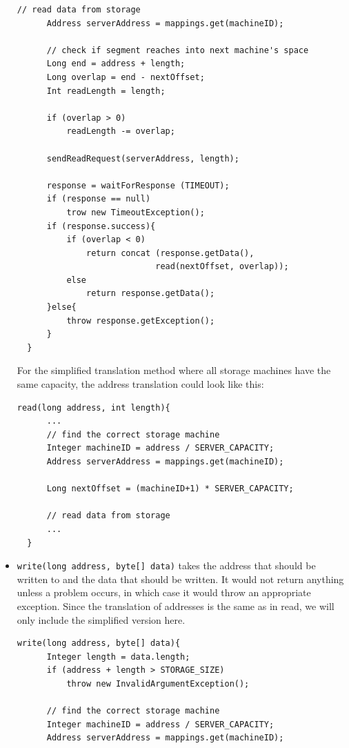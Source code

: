 \documentclass[12pt,a4paper]{article}
\begin{document}
\begin{itemize}
\begin{lstlisting}[basicstyle=\footnotesize]
      // read data from storage
      Address serverAddress = mappings.get(machineID);
      
      // check if segment reaches into next machine's space
      Long end = address + length;
      Long overlap = end - nextOffset;
      Int readLength = length;
      
      if (overlap > 0)
          readLength -= overlap;
      
      sendReadRequest(serverAddress, length);
      
      response = waitForResponse (TIMEOUT);
      if (response == null)
          trow new TimeoutException();
      if (response.success){
          if (overlap < 0)
              return concat (response.getData(),
                            read(nextOffset, overlap));
          else
              return response.getData();
      }else{
          throw response.getException();
      }
  }
  \end{lstlisting}
  
  For the simplified translation method where all storage machines have the same capacity, the address translation could look like this:
  \begin{lstlisting}[basicstyle=\footnotesize]
  read(long address, int length){ 
      ...
      // find the correct storage machine     
      Integer machineID = address / SERVER_CAPACITY;
      Address serverAddress = mappings.get(machineID);
      
      Long nextOffset = (machineID+1) * SERVER_CAPACITY;
      
      // read data from storage
      ...
  }
  \end{lstlisting}
  
  \item \texttt{write(long address, byte[] data)} takes the address that should be written to and the data that should be written. It would not return anything unless a problem occurs, in which case it would throw an appropriate exception. Since the translation of addresses is the same as in read, we will only include the simplified version here.
  
  \begin{lstlisting}[basicstyle=\footnotesize]
  write(long address, byte[] data){
      Integer length = data.length;
      if (address + length > STORAGE_SIZE)
          throw new InvalidArgumentException();
          
      // find the correct storage machine     
      Integer machineID = address / SERVER_CAPACITY;
      Address serverAddress = mappings.get(machineID);
      

\end{lstlisting}
\end{itemize}
\end{document}
